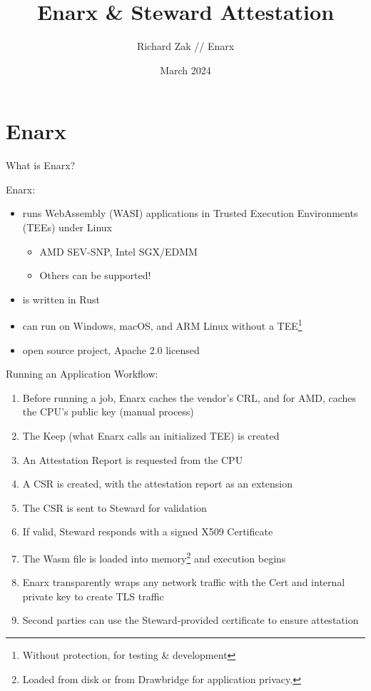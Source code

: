 \documentclass[graphics]{beamer}
\title{Enarx \& Steward Attestation}
\author{Richard Zak // Enarx}
\date{March 2024}
\begin{document}
\begin{frame}
\maketitle
\end{frame}

\frame{\tableofcontents}

\section{Enarx}
\begin{frame}{What is Enarx?}

Enarx:
\begin{itemize}
\item runs WebAssembly (WASI) applications in Trusted Execution Environments (TEEs) under Linux
\begin{itemize}
\item AMD SEV-SNP, Intel SGX/EDMM
\item Others can be supported!
\end{itemize}
\item is written in Rust
\item can run on Windows, macOS, and ARM Linux without a TEE\footnote{Without protection, for testing \& development}
\item open source project, Apache 2.0 licensed
\end{itemize}

\end{frame}

\begin{frame}{Running an Application}
Workflow:
\begin{enumerate}
    \item Before running a job, Enarx caches the vendor's CRL, and for AMD, caches the CPU's public key (manual process)
    \item The Keep (what Enarx calls an initialized TEE) is created
    \item An Attestation Report is requested from the CPU
    \item A CSR is created, with the attestation report as an extension
    \item The CSR is sent to Steward for validation
    \item If valid, Steward responds with a signed X509 Certificate
    \item The Wasm file is loaded into memory\footnote{Loaded from disk or from Drawbridge for application privacy.} and execution begins
    \item Enarx transparently wraps any network traffic with the Cert and internal private key to create TLS traffic
    \item Second parties can use the Steward-provided certificate to ensure attestation
\end{enumerate}

\end{frame}
\end{document}
